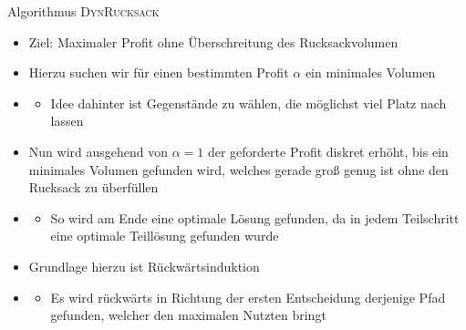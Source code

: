 \begin{frame}{Algorithmus \textsc{DynRucksack}}
\begin{itemize}
	\item Ziel: Maximaler Profit ohne Überschreitung des Rucksackvolumen
    \item Hierzu suchen wir für einen bestimmten Profit $\alpha$ ein minimales Volumen
    \item[] \begin{itemize}
        \item Idee dahinter ist Gegenstände zu wählen, die möglichst viel Platz nach  lassen
       \end{itemize} 
    \item Nun wird ausgehend von $\alpha=1$ der geforderte Profit diskret erhöht, bis ein minimales Volumen gefunden wird, welches gerade groß genug ist ohne den Rucksack zu überfüllen
    \item[] \begin{itemize}
        \item So wird am Ende eine optimale Lösung gefunden, da in jedem Teilschritt eine optimale Teillösung gefunden wurde
       \end{itemize} 
    \item Grundlage hierzu ist Rückwärtsinduktion
    \item[] \begin{itemize}
        \item Es wird rückwärts in Richtung der ersten Entscheidung derjenige Pfad gefunden, welcher den maximalen Nutzten bringt
       \end{itemize}
    
    
\end{itemize}
\end{frame}

